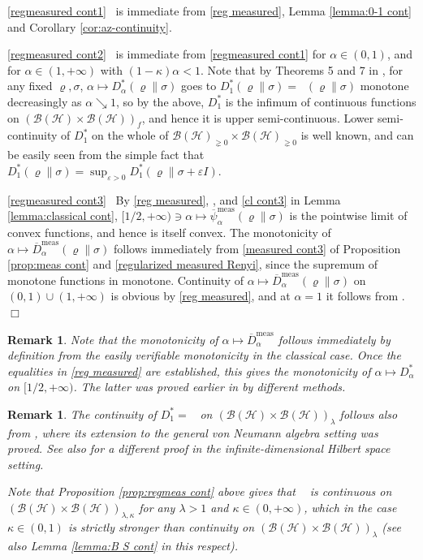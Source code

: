 \documentclass[unsortedaddress,superscriptaddress,pra,notitlepage]{revtex4}
\newtheorem{rem}[definition]{Remark}
\newenvironment{proof}[1][Proof]{\begin{trivlist}
\item[\hskip \labelsep {\bfseries #1}]}{\hfill$\Box$\end{trivlist}}
\def\B{{\mathcal B}}
\def\ep{\varepsilon}
\def\rho{\varrho}
\def\hil{{\mathcal H}}
\def\bz{\left(}
\def\jz{\right)}
\def\oll{\overline}
\def\nw{^{*}}
\def\meas{\mathrm{meas}}
\def\pne{_{\gneq 0}}
\def\pwr{\kappa}
\newcommand{\s}{\mbox{ }}
\DeclareMathOperator{\DU}{\mathit{D}^{Um}}
\begin{document}
\begin{proof}
\ref{regmeasured cont1}\s 
is immediate from \eqref{reg measured}, Lemma \ref{lemma:0-1 cont} and 
Corollary \ref{cor:az-continuity}.

\ref{regmeasured cont2}\s
is immediate from \ref{regmeasured cont1} for $\alpha\in(0,1)$, and 
for $\alpha\in(1,+\infty)$ with $(1-\pwr)\alpha<1$.
Note that by Theorems 5 and 7 in \cite{Renyi_new}, for any fixed $\rho,\sigma$, $\alpha\mapsto D_{\alpha}\nw(\rho\|\sigma)$
goes to $D_1\nw(\rho\|\sigma)=\DU(\rho\|\sigma)$ monotone decreasingly as $\alpha\searrow 1$, so by the above,
$D_1\nw$ is the infimum of continuous functions on 
$\bz\B(\hil)\times\B(\hil)\jz_{f}$,
and hence it is upper semi-continuous. 
Lower semi-continuity of $D_1\nw$ on the whole of $\B(\hil)\pne\times\B(\hil)\pne$
is well known, and can be easily seen from the simple fact that $D_1\nw(\rho\|\sigma)=\sup_{\ep>0}D_1\nw(\rho\|\sigma+\ep I)$. 

\ref{regmeasured cont3}\s
By \eqref{reg measured}, \cite[Corollary 4]{HT14}, and \ref{cl cont3} in Lemma \ref{lemma:classical cont}, 
$[1/2,+\infty)\ni\alpha\mapsto \oll{\psi}_{\alpha}^{\meas}(\rho\|\sigma)$
is the pointwise limit of convex functions, and hence is itself convex. 
The monotonicity 
of $\alpha\mapsto \oll{D}_{\alpha}^{\meas}(\rho\|\sigma)$ 
follows immediately from 
\ref{measured cont3} of Proposition \ref{prop:meas cont} and \eqref{regularized measured Renyi}, since the supremum of 
monotone functions in monotone.
Continuity of $\alpha\mapsto \oll{D}_{\alpha}^{\meas}(\rho\|\sigma)$
on $(0,1)\cup(1,+\infty)$ is obvious by \eqref{reg measured}, and at $\alpha=1$ it follows from 
\cite[Theorem 5]{Renyi_new}.
\end{proof}

\begin{rem}
Note that the monotonicity of $\alpha\mapsto \oll{D}_{\alpha}^{\meas}$
follows immediately by definition from the easily verifiable monotonicity in the classical case. Once the 
equalities in 
\eqref{reg measured} are established, this gives the monotonicity of 
$\alpha\mapsto D_{\alpha}\nw$ on $[1/2,+\infty)$. The latter was proved earlier in 
\cite{Renyi_new} by different methods.
\end{rem}

\begin{rem}\label{rem:Umegaki cont}
The continuity of $D_1\nw=\DU$ on 
$\bz\B(\hil)\times\B(\hil)\jz_{\lambda}$ follows also from 
\cite[Theorem 3.7]{Araki_relentr}, 
where its extension to the 
general von Neumann algebra setting was proved. 
See also \cite{Shirokov2022} for a different proof in the infinite-dimensional Hilbert space setting. 

Note that Proposition \ref{prop:regmeas cont} above gives that 
$\DU$ is continuous on $(\B(\hil)\times\B(\hil))_{\lambda,\pwr}$ for any 
$\lambda>1$ and $\pwr\in(0,+\infty)$, which in the case 
$\pwr\in(0,1)$ is strictly stronger than continuity on 
$\bz\B(\hil)\times\B(\hil)\jz_{\lambda}$ (see also Lemma \ref{lemma:B S cont} in this respect).
\end{rem}
\end{document}
